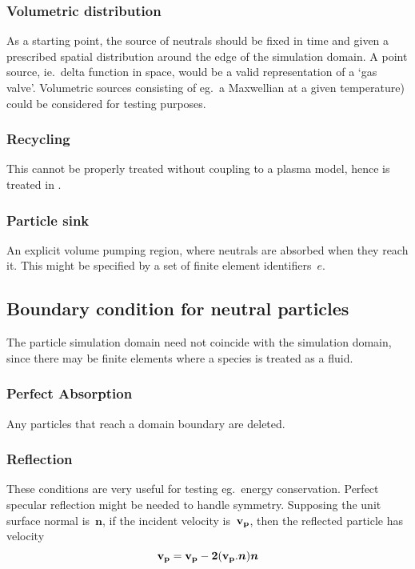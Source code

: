 
\subsubsection{Volumetric distribution}\label{sec:voldist}
As a starting point, the source of neutrals should be fixed
in time and given a prescribed spatial distribution around the edge
of the simulation domain. A point source, ie.\ delta function in space, 
would be a valid representation of a `gas valve'. Volumetric sources  consisting
of eg.\ a Maxwellian at a given temperature) could be considered for testing purposes.

\subsubsection{Recycling}\label{sec:recyc}
This cannot be properly treated without coupling to a plasma model,
hence is treated in  .

\subsubsection{Particle sink}\label{sec:volsink}
An explicit volume pumping region,
where neutrals are absorbed when they reach it. This might be
specified by a set of finite element identifiers~$e$.

\subsection{Boundary condition for neutral particles}\label{sec:bcs}
The particle simulation domain need not coincide with the simulation domain, 
since there may be finite elements where a species is treated as a fluid.
\subsubsection{Perfect Absorption}\label{sec:bcsperf}
Any particles that reach a domain boundary are deleted.
\subsubsection{Reflection}\label{sec:bcsrefl}
These conditions are very useful for testing eg.\ energy conservation. 
Perfect specular reflection might be needed to handle symmetry. Supposing
the unit surface normal is~$\boldsymbol{n}$, if the incident velocity is~$\bf{v}_p$,
then the reflected particle has velocity
\begin{equation}\label{eq:bcsreflvel}
\bf{v}_p=\bf{v}_p-2 (\bf{v}_p.\boldsymbol{n}) \boldsymbol{n}
\end{equation}
